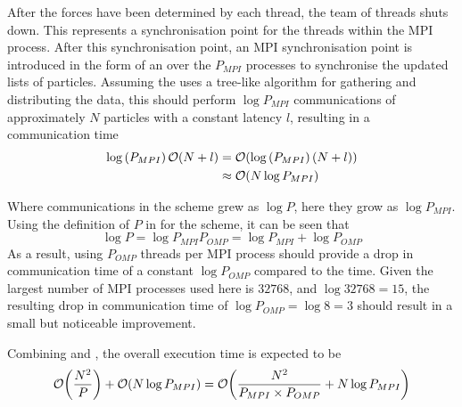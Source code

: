 %
After the forces have been determined by each thread, the team of threads
shuts down.
%
This represents a synchronisation point for the threads within the
MPI process.
%
After this \openmp{} synchronisation point,
an MPI synchronisation point is introduced in the form of
an \mpiallgatherv{} over the $P_{MPI}$ processes
to synchronise the updated lists of particles.
%
Assuming the \mpiallgatherv{} uses a tree-like algorithm for
gathering and distributing the data, this should perform
$\log{P_{MPI}}$ communications of approximately $N$ particles
with a constant latency $l$, resulting in a communication time
\begin{equation}
    \label{eqn:shared_andreplicated_communication_time}
    \begin{split}
        \log{(P_{MPI})}\,\mathcal{O}{\left({ N + l }\right)} 
            &= \mathcal{O}{\left({ \log{(P_{MPI})}\,(N+l) }\right)} \\
            &\approx{} \mathcal{O}{\left({ N\log{P_{MPI}} }\right)}
    \end{split}
\end{equation}

Where communications in the \replicateddata{} scheme grew as $\log{P}$,
here they grow as $\log{P_{MPI}}$.
%
Using the definition of $P$ in  for the
\sharedandreplicateddata{} scheme, it can be seen that
\begin{equation}
    \log{P} = \log{P_{MPI}P_{OMP}} = \log{P_{MPI}} + \log{P_{OMP}}
\end{equation}
%
As a result, using $P_{OMP}$ threads per MPI process should provide
a drop in communication time of a constant $\log{P_{OMP}}$ compared
to the \replicateddata{} time.
%
Given the largest number of MPI processes used here is $32768$,
and $\log{32768} = 15$, the resulting drop in communication
time of $\log{P_{OMP}} = \log{8} = 3$ should result in a small
but noticeable improvement.


%
Combining
 and
,
the overall execution time is expected to be
\begin{equation}
    \label{eqn:shared_and_replicated_data_overall_time}
    \mathcal{O}{\left({ \frac{N^2}{P} }\right)} + \mathcal{O}{\left({ N\log{P_{MPI}} }\right)}
        = \mathcal{O}{\left({ \frac{N^2}{P_{MPI} \times{} P_{OMP}} + N\log{P_{MPI}} }\right)}
\end{equation}


